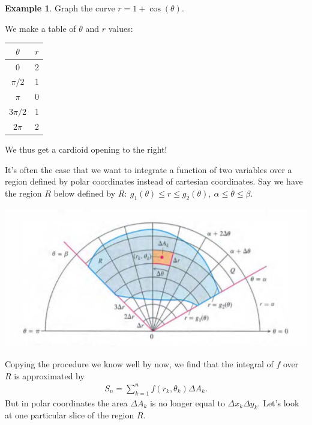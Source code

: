 \documentclass[12pt, letter]{article}
\theoremstyle{plain}
\numberwithin{theorem}{section}
\theoremstyle{definition}
\newtheorem{example}[theorem]{Example}
\begin{document}
\bigskip

\hrulefill

\bigskip

\begin{example}
Graph the curve $r=1+\cos(\theta)$.

\bigskip

We make a table of $\theta$ and $r$ values:
\begin{center}
\begin{tabular}{ |c|c| } 
 $\theta$ & $r$\\ 
 \hline
 0 & 2\\ 
 $\pi/2$ & 1\\ 
 $\pi$ & 0\\
 $3\pi/2$ & 1\\
 $2\pi$ & 2
\end{tabular}
\end{center}

\bigskip

We thus get a cardioid opening to the right!

\end{example}

\bigskip

\hrulefill

\bigskip

It's often the case that we want to integrate a function of two variables over a region defined by polar coordinates instead of cartesian coordinates. Say we have the region $R$ below defined by $R: \ g_1(\theta) \leq r \leq g_2(\theta), \ \alpha \leq \theta \leq \beta$.

\bigskip

\begin{center}
\includegraphics[scale=0.7]{m3_f12}
\end{center}

\bigskip

Copying the procedure we know well by now, we find that the integral of $f$ over $R$ is approximated by
\begin{align*}
S_n = \sum_{k=1}^n f(r_k,\theta_k)\Delta A_k.
\end{align*}
But in polar coordinates the area $\Delta A_k$ is no longer equal to $\Delta x_k \Delta y_k$. Let's look at one particular slice of the region $R$.
\end{document}
